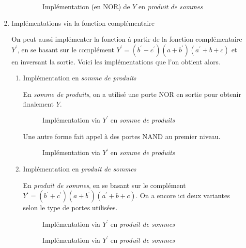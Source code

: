 \documentclass[letter, oneside]{book}
\begin{document}
\begin{enumerate}
\begin{enumerate}
\begin{figure}[htbp]
\centering

\caption{\label{fig:orgc179d31}Implémentation (en NOR) de \(Y\) en \emph{produit de sommes}}
\end{figure}
\end{enumerate}


\item Implémentations via la fonction complémentaire
\label{sec:orga0cc793}

On peut aussi implémenter la fonction à partir de la fonction
complémentaire \(Y^\prime\), en se basant sur le complément \(Y^\prime
= (b^\prime +c^\prime )(a+b^\prime )(a^\prime +b+c)\) et en inversant
la sortie. Voici les implémentations que l'on obtient alors.

\begin{enumerate}
\item Implémentation en \emph{somme de produits}
\label{sec:orgba075be}

En \emph{somme de produits}, on a utilisé une porte NOR en sortie pour
obtenir finalement \(Y\).

\begin{figure}[htbp]
\centering

\caption{\label{fig:org8b5a39e}Implémentation via \(Y^\prime\) en \emph{somme de produits}}
\end{figure} 

Une autre forme fait appel à des portes NAND au premier niveau.

\begin{figure}[htbp]
\centering

\caption{\label{fig:org49308ba}Implémentation via \(Y^\prime\) en \emph{somme de produits}}
\end{figure} 

\item Implémentation en \emph{produit de sommes}
\label{sec:org38764e3}

En \emph{produit de sommes}, en se basant sur le complément \(Y^\prime =
(b^\prime +c^\prime )(a+b^\prime )(a^\prime +b+c)\). On a encore ici
deux variantes selon le type de portes utilisées.

\begin{figure}[htbp]
\centering

\caption{\label{fig:org9c31faa}Implémentation via \(Y^\prime\) en \emph{produit de sommes}}
\end{figure} 


\begin{figure}[htbp]
\centering

\caption{\label{fig:org9818a25}Implémentation via \(Y^\prime\) en \emph{produit de sommes}}
\end{figure}
\end{enumerate}
\end{enumerate}
\end{document}
